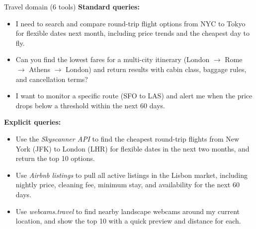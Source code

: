 \begin{examplebox}{Travel domain (6 tools)}
\textbf{Standard queries:}
\begin{itemize}\setlength{\itemsep}{1pt}
    \item I need to search and compare round-trip flight options from
    NYC to Tokyo for flexible dates next month, including price trends
    and the cheapest day to fly.
    \item Can you find the lowest fares for a multi-city itinerary
    (London $\to$ Rome $\to$ Athens $\to$ London) and return results
    with cabin class, baggage rules, and cancellation terms?
    \item I want to monitor a specific route (SFO to LAS) and alert me
    when the price drops below a threshold within the next 60 days.
\end{itemize}

\smallskip
\textbf{Explicit queries:}
\begin{itemize}\setlength{\itemsep}{1pt}
    \item Use the \emph{Skyscanner API} to find the cheapest round-trip
    flights from New York (JFK) to London (LHR) for flexible dates in
    the next two months, and return the top 10 options.
    \item Use \emph{Airbnb listings} to pull all active listings in the
    Lisbon market, including nightly price, cleaning fee, minimum stay,
    and availability for the next 60 days.
    \item Use \emph{webcams.travel} to find nearby landscape webcams
    around my current location, and show the top 10 with a quick
    preview and distance for each.
\end{itemize}
\end{examplebox}

